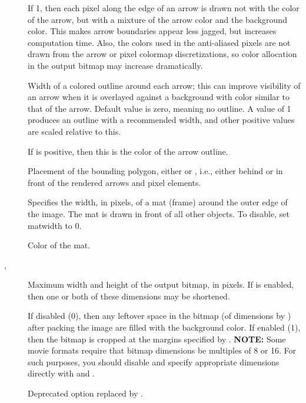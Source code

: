 \begin{description}
\item[]
 If 1, then each pixel along the edge of an arrow is
 drawn not with the color of the arrow, but with a mixture of the arrow
 color and the background color.  This makes arrow boundaries appear
 less jagged, but increases computation time.  Also, the colors used in
 the anti-aliased pixels are not drawn from the arrow or pixel colormap
 discretizations, so color allocation in the output bitmap may increase
 dramatically.
\item[]
 Width of a colored outline around each arrow; this can improve
 visibility of an arrow when it is overlayed against a background with
 color similar to that of the arrow.  Default value is zero, meaning no
 outline.  A value of 1 produces an outline with a recommended width,
 and other positive values are scaled relative to this.
\item[]
 If  is positive, then this is the color of the
 arrow outline.
\item[]
 Placement of the bounding polygon, either  or ,
 i.e., either behind or in front of the rendered arrows and pixel
 elements.
\item[]
 Specifies the width, in pixels, of a mat (frame) around the outer edge
 of the image.  The mat is drawn in front of all other objects.  To
 disable, set matwidth to 0.
\item[]
 Color of the mat.
\item[, ]
 Maximum width and height of the output bitmap, in pixels.  If
  is enabled, then one or both of these dimensions
 may be shortened.
\item[]
 If disabled (0), then any leftover space in the bitmap (of dimensions
  by ) after packing the image are filled
 with the background color.  If enabled (1), then the bitmap is cropped
 at the margins specified by . {\bf NOTE:} Some movie
 formats require that bitmap dimensions be multiples of 8 or 16.  For
 such purposes, you should disable  and specify
 appropriate dimensions directly with  and
 .
\item[] Deprecated option replaced by .
\end{description}

